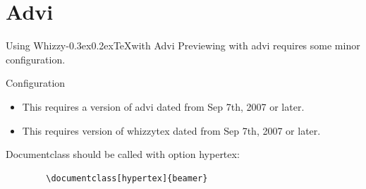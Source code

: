 \documentclass{beamer}
\makeatletter
\def \WhizzyTeX {{Whizzy\kern -0.3ex\raise 0.2ex\hbox{\let \@\relax\TeX}}}
\makeatother
\begin{document}
\section{Advi}
\begin{frame}{Using \WhizzyTeX with Advi}
Previewing with advi requires some minor configuration.
\end{frame}
\begin{frame}[fragile=singleslide]{Configuration}
\begin{itemize}
\item This requires a version of advi  dated from Sep 7th, 2007 or later.
\item This requires version of whizzytex dated from Sep 7th, 2007 or later.
\end{itemize}
Documentclass should be called with option hypertex:
\begin{verbatim}
        \documentclass[hypertex]{beamer}
\end{verbatim}
\end{frame}
\end{document}
